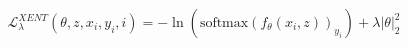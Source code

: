 \documentclass[preview]{standalone}
\begin{document}
\begin{align*}
\mathcal{L}_{\lambda}^{XENT}(\theta, z, x_i, y_i, i) = - \ln(\text{softmax}(f_{\theta}(x_i, z))_{y_i}) + \lambda \left| \theta \right|_2^2
\end{align*}
\end{document}
